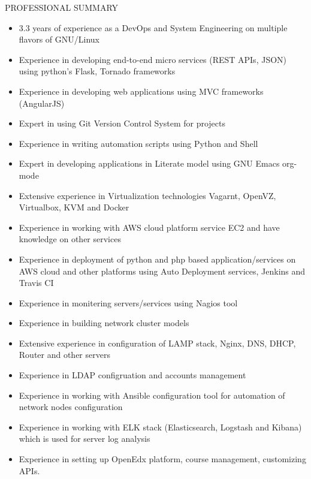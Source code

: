 \documentclass{resume} %
\begin{document}
\begin{rSection}{PROFESSIONAL SUMMARY}
  
  \begin{itemize}
    
  \item 3.3 years of experience as a DevOps and System
    Engineering on multiple flavors of GNU/Linux
    
  \item Experience in developing end-to-end micro services
    (REST APIs, JSON) using python's Flask, Tornado
    frameworks
    
  \item Experience in developing web applications using MVC frameworks
    (AngularJS)
    
  \item Expert in using Git Version Control System for projects

  \item Experience in writing automation scripts using Python and Shell

  \item Expert in developing applications in Literate model
    using GNU Emacs org-mode
    
  \item Extensive experience in Virtualization technologies
    Vagarnt, OpenVZ, Virtualbox, KVM and Docker

  \item Experience in working with AWS cloud platform
    service EC2 and have knowledge on other services

  \item Experience in deployment of python and php based
    application/services on AWS cloud and other platforms
    using Auto Deployment services, Jenkins and Travis CI

  \item Experience in monitering servers/services using
    Nagios tool
    
  \item Experience in building network cluster models
    
  \item Extensive experience in configuration of LAMP stack,
    Nginx, DNS, DHCP, Router and other servers
    
  \item Experience in LDAP configruation and accounts
    management
    
  \item Experience in working with Ansible configuration
    tool for automation of network nodes configuration

  \item Experience in working with ELK stack (Elasticsearch,
    Logstash and Kibana) which is used for server log
    analysis
    
  \item Experience in setting up OpenEdx platform, course
    management, customizing APIs.

  \end{itemize}

\end{rSection}
\end{document}

